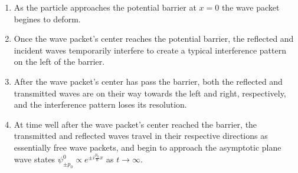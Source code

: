 \documentclass[11pt, a4paper]{article}
\begin{document}
\begin{itemize}
\begin{enumerate}
        \item As the particle approaches the potential barrier at $ x = 0 $ the wave packet begines to deform. 

        \item Once the wave packet's center reaches the potential barrier, the reflected and incident waves temporarily interfere to create a typical interference pattern on the left of the barrier. 

        \item After the wave packet's center has pass the barrier, both the reflected and transmitted waves are on their way towards the left and right, respectively, and the interference pattern loses its resolution. 

        \item At time well after the wave packet's center reached the barrier, the transmitted and reflected waves travel in their respective directions as essentially free wave packets, and begin to approach the asymptotic plane wave states $ \psi_{\pm p_{0}}^{0} \propto e^{\pm i \frac{p_{0}}{\hbar} x} $ as $ t \to \infty $.
    \end{enumerate}
    
\end{itemize}
\end{document}
